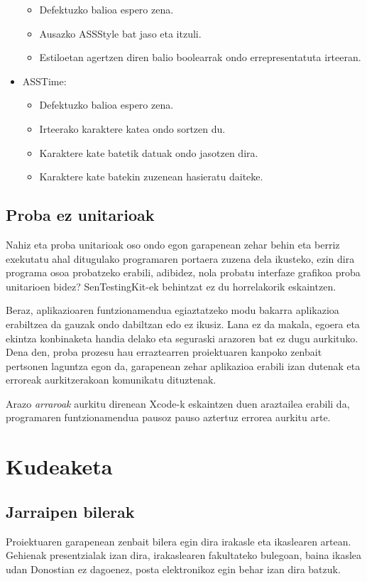 \begin{itemize}
\begin{itemize}
		\item Defektuzko balioa espero zena.
		\item Ausazko ASSStyle bat jaso eta itzuli.
		\item Estiloetan agertzen diren balio boolearrak ondo errepresentatuta irteeran. 
	\end{itemize}
	\item ASSTime: \begin{itemize}
		\item Defektuzko balioa espero zena.
		\item Irteerako karaktere katea ondo sortzen du.
		\item Karaktere kate batetik datuak ondo jasotzen dira.
		\item Karaktere kate batekin zuzenean hasieratu daiteke.
	\end{itemize}
\end{itemize}

\subsection{Proba ez unitarioak}
Nahiz eta proba unitarioak oso ondo egon garapenean zehar behin eta berriz exekutatu ahal ditugulako programaren portaera zuzena dela ikusteko, ezin dira programa osoa probatzeko erabili, adibidez, nola probatu interfaze grafikoa proba unitarioen bidez? SenTestingKit-ek behintzat ez du horrelakorik eskaintzen.

Beraz, aplikazioaren funtzionamendua egiaztatzeko modu bakarra aplikazioa erabiltzea da gauzak ondo dabiltzan edo ez ikusiz. Lana ez da makala, egoera eta ekintza konbinaketa handia delako eta seguraski arazoren bat ez dugu aurkituko. Dena den, proba prozesu hau erraztearren proiektuaren kanpoko zenbait pertsonen laguntza egon da, garapenean zehar aplikazioa erabili izan dutenak eta erroreak aurkitzerakoan komunikatu dituztenak.

Arazo \textit{arraroak} aurkitu direnean Xcode-k eskaintzen duen araztailea erabili da, programaren funtzionamendua pausoz pauso aztertuz errorea aurkitu arte.

\section{Kudeaketa}

\subsection{Jarraipen bilerak}
Proiektuaren garapenean zenbait bilera egin dira irakasle eta ikaslearen artean. Gehienak presentzialak izan dira, irakaslearen fakultateko bulegoan, baina ikaslea udan Donostian ez dagoenez, posta elektronikoz egin behar izan dira batzuk.

